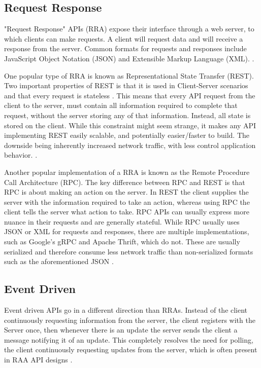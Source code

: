 \subsection{Request Response}
"Request Response" APIs (RRA) expose their interface through a web server, to which clients can make requests. A client will request data and will receive a response from the server. Common formats for requests and responses include JavaScript Object Notation (JSON) and Extensible Markup Language (XML). \cite{DesigningWebApis}. 

One popular type of RRA is known as Representational State Transfer (REST). Two important properties of REST is that it is used in Client-Server scenarios and that every request is stateless \cite{ArchitecturalStylesAPIs}. This means that every API request from the client to the server, must contain all information required to complete that request, without the server storing any of that information. Instead, all state is stored on the client. While this constraint might seem strange, it makes any API implementing REST easily scalable, and potentially easier/faster to build. The downside being inherently increased network traffic, with less control application behavior. \cite{ArchitecturalStylesAPIs}.

Another popular implementation of a RRA is known as the Remote Procedure Call Architecture (RPC). The key difference between RPC and REST is that RPC is about making an action on the server. In REST the client supplies the server with the information required to take an action, whereas using RPC the client tells the server what action to take. RPC APIs can usually express more nuance in their requests and are generally stateful. While RPC usually uses JSON or XML for requests and responses, there are multiple implementations, such as Google's gRPC and Apache Thrift, which do not. These are usually serialized and therefore consume less network traffic than non-serialized formats such as the aforementioned JSON \cite{DesigningWebApis}. 

\subsection{Event Driven}
Event driven APIs go in a different direction than RRAs. Instead of the client continuously requesting information from the server, the client registers with the Server once, then whenever there is an update the server sends the client a message notifying it of an update. This completely resolves the need for polling, the client continuously requesting updates from the server, which is often present in RAA API designs \cite{DesigningWebApis}.

